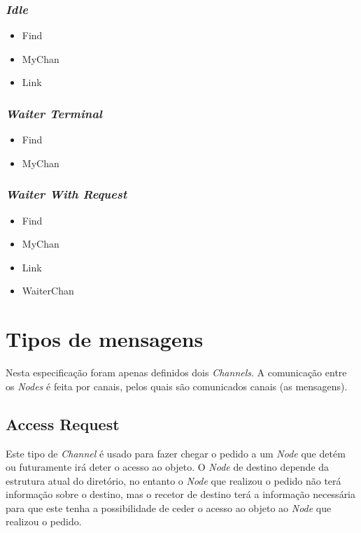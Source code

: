 \subsubsection*{\emph{Idle}}
\begin{itemize}
    \item Find
    \item MyChan
    \item Link
\end{itemize}
\subsubsection*{\emph{Waiter Terminal}}
\begin{itemize}
    \item Find
    \item MyChan
\end{itemize}
\subsubsection*{\emph{Waiter With Request}}
\begin{itemize}
    \item Find 
    \item MyChan 
    \item Link 
    \item WaiterChan 
\end{itemize}



\section{Tipos de mensagens}
\label{especificacao:sec:Channels}
Nesta especificação foram apenas definidos dois \emph{Channels}. A comunicação entre os \emph{Nodes} é feita por canais, pelos quais são comunicados canais (as mensagens).


\subsection*{Access Request}
Este tipo de \emph{Channel} é usado para fazer chegar o pedido a um \emph{Node} que detém ou futuramente irá deter o acesso ao objeto. O \emph{Node} de destino depende da estrutura atual do diretório, no entanto o \emph{Node} que realizou o pedido não terá informação sobre o destino, mas o recetor de destino terá a informação necessária para que este tenha a possibilidade de ceder o acesso ao objeto ao \emph{Node} que realizou o pedido.

